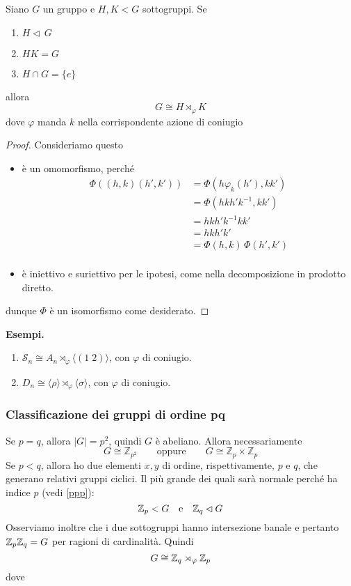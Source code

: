 \begin{multicols}{2}
\begin{theorem}[di decomposizione]
	Siano $ G $ un gruppo e $ H, K < G $ sottogruppi. Se
	\begin{enumerate}
		\item $ H \lhd\, G $
		\item $ HK = G $
		\item $ H \cap G = \{e\} $
	\end{enumerate}
allora $$  G \cong H \rtimes_\varphi K  $$ dove $ \varphi $ manda $ k $ nella corrispondente azione di coniugio 
\end{theorem}
\begin{proof}
	Consideriamo 
	questo
	\begin{itemize}
		\item è un omomorfismo, perché \begin{align*}
			\Phi((h, k)(h', k')) &= \Phi(h\varphi_k(h'), kk') \\
			&= \Phi(hkh'k^{-1}, kk') \\
			&= hkh'k^{-1}kk' \\
			&= hkh'k'\\
			&= \Phi(h, k)\,\Phi(h', k')\\
		\end{align*}
		\item è iniettivo e suriettivo per le ipotesi, come nella decomposizione in prodotto diretto.
	\end{itemize}
dunque $ \Phi $ è un isomorfismo come desiderato.
\end{proof}

\textbf{Esempi.}
\begin{enumerate}
	\item $ \mathcal{S}_n \cong A_n \rtimes_\varphi \langle (1 \; 2) \rangle $, con $ \varphi $ di coniugio.
	\item $ D_n \cong \langle \rho \rangle \rtimes_\varphi \langle \sigma \rangle $, con $ \varphi $ di coniugio.
\end{enumerate}

\columnbreak
\subsubsection{Classificazione dei gruppi di ordine pq}

Se $ p = q $, allora $ |G| = p^2 $, quindi $ G $ è abeliano. Allora necessariamente
\[ G \cong \mathbb{Z}_{p^2}  \qquad \text{oppure} \qquad G \cong \mathbb{Z}_{p}\times\mathbb{Z}_{p} \]
Se $ p < q $, allora ho due elementi $ x, y $ di ordine, rispettivamente, $ p $ e $ q $, che generano relativi gruppi ciclici. Il più grande dei quali sarà normale perché ha indice $ p $ (vedi \ref{ppp}):
$$  \mathbb{Z}_p < G \quad\text{e}\quad \mathbb{Z}_q \lhd G $$
Osserviamo inoltre che i due sottogruppi hanno intersezione banale e pertanto $ \mathbb{Z}_p\mathbb{Z}_q = G $ per ragioni di cardinalità. Quindi
\[ G \cong \mathbb{Z}_q \rtimes_{\varphi} \mathbb{Z}_p \]
dove


\end{multicols}
